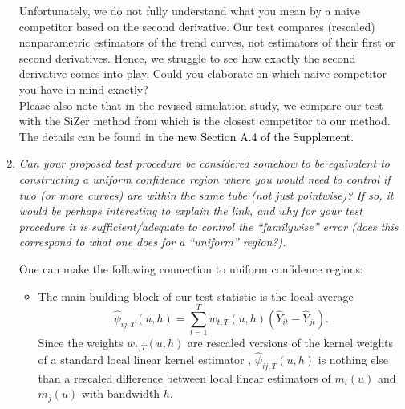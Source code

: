 \documentclass[a4paper,12pt]{article}
\newcommand{\reference}[1]{\textcolor{black}{#1}}
\begin{document}
\begin{enumerate}[label=\arabic*.,leftmargin=0.6cm]
Unfortunately, we do not fully understand what you mean by a naive competitor based on the second derivative.
Our test compares (rescaled) nonparametric estimators of the trend curves, not estimators of their first or second derivatives.  
Hence, we struggle to see how exactly the second derivative comes into play.
Could you elaborate on which naive competitor you have in mind exactly? \\
Please also note that in the revised simulation study, we compare our test with the SiZer method from \cite{Park2009} which is the closest competitor to our method. The details can be found in \reference{the new Section A.4 of the Supplement}. 
  


\item \textit{Can your proposed test procedure be considered somehow to be equivalent to constructing a uniform confidence region where you would need to control if two (or more curves) are within the same tube (not just pointwise)? If so, it would be perhaps interesting to explain the link, and why for your test procedure it is sufficient/adequate to control the ``familywise'' error (does this correspond to what one does for a ``uniform'' region?).}

One can make the following connection to uniform confidence regions: 
\begin{itemize}[leftmargin=0.45cm,itemsep=0pt,topsep=0pt]

\item The main building block of our test statistic is the local average
\[ \widehat{\psi}_{ij,T}(u,h) = \sum_{t=1}^T w_{t,T}(u,h) (\widehat{Y}_{it} - \widehat{Y}_{jt}). \]
Since the weights $w_{t,T}(u,h)$ are rescaled versions of the kernel weights of a standard local linear kernel estimator \citep{FanGijbels1996}, $\widehat{\psi}_{ij,T}(u,h)$ is nothing else than a rescaled difference between local linear estimators of $m_i(u)$ and $m_j(u)$ with bandwidth $h$. 


\end{itemize}
\end{enumerate}
\end{document}

